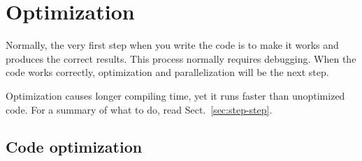 
\chapter{Optimization}
\label{chap:optimization}


Normally, the very first step when you write the code is to make it
works and produces the correct results. This process normally requires
debugging. When the code works correctly, optimization and
parallelization will be the next step.

Optimization causes longer compiling time, yet it runs faster than
unoptimized code. For a summary of what to do, read
Sect.~\ref{sec:step-step}.

\section{Code optimization}
\label{sec:code-optimization}

